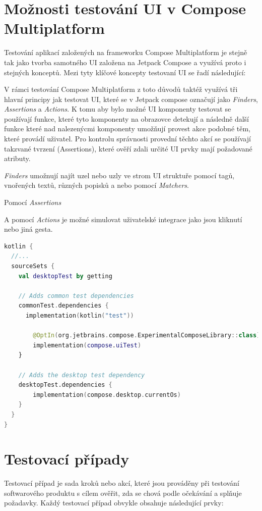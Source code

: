 \section{Možnosti testování UI v Compose Multiplatform}
Testování aplikací založených na frameworku Compose Multiplatform je stejně tak jako tvorba samotného UI založena na Jetpack Compose a využívá 
proto i stejných konceptů. Mezi tyty klíčové koncepty testovaní UI se řadí následující:


V rámci testování
Compose Multiplatform z toto důvodů taktéž využívá tři hlavní principy jak testovat UI, které se v Jetpack compose
označují jako \textit{Finders}, \textit{Assertions} a \textit{Actions}. 
K tomu aby bylo možné UI komponenty testovat se používají funkce, které tyto komponenty na obrazovce detekují a následně další funkce které nad nalezenýcmi 
komponenty umožňují provest akce podobné těm, které provádí uživatel. Pro kontrolu správnosti provední těchto akcí se používají takzvané tvrzení 
(Assertions), které ověří zdali určité UI prvky mají požadované atributy.

\textit{Finders} umožnují najít uzel nebo uzly ve strom UI struktuře pomocí tagů, vnořených textů, různých popisků a nebo pomocí \textit{Matchers}.


Pomocí \textit{Assertions}

A pomocí \textit{Actions} je možné simulovat uživatelské integrace jako jsou kliknutí nebo jiná gesta. \cite{composeTesting}


\begin{lstlisting}[caption={Integrace testů Gradle}, label={lst:testsIntegration}, language=Kotlin]
kotlin {
  //...
  sourceSets {
    val desktopTest by getting

    // Adds common test dependencies
    commonTest.dependencies {
      implementation(kotlin("test"))

        @OptIn(org.jetbrains.compose.ExperimentalComposeLibrary::class)
        implementation(compose.uiTest)
    }

    // Adds the desktop test dependency
    desktopTest.dependencies {
        implementation(compose.desktop.currentOs)
    }
  }
}
\end{lstlisting}
\section{Testovací případy}
Testovací případ je sada kroků nebo akcí, které jsou prováděny při testování softwarového produktu s cílem ověřit, zda se chová podle očekávání a splňuje 
požadavky. Každý testovací případ obvykle obsahuje následující prvky:

